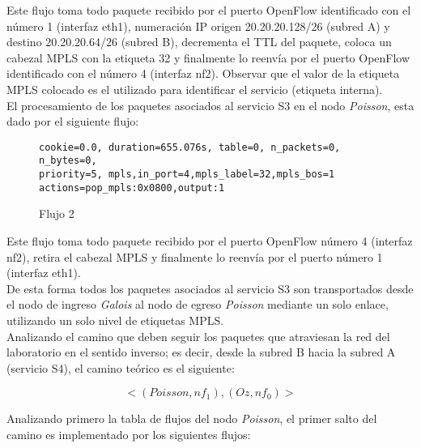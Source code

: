 Este flujo toma todo paquete recibido por el puerto OpenFlow identificado con el n\'umero 1 (interfaz eth1), numeración IP origen 20.20.20.128/26 (subred A) y destino 20.20.20.64/26 (subred B), decrementa el TTL del paquete, coloca un cabezal MPLS con la etiqueta 32 y finalmente lo reenvía por el puerto OpenFlow identificado con el n\'umero 4 (interfaz nf2). Observar que el valor de la etiqueta MPLS colocado es el utilizado para identificar el servicio (etiqueta interna). \\


El procesamiento de los paquetes asociados al servicio S3 en el nodo \textit{Poisson}, esta dado por el siguiente flujo:

\begin{figure}[h]
\texttt{cookie=0.0, duration=655.076s, table=0, n\_packets=0, n\_bytes=0, \\
priority=5, mpls,in\_port=4,mpls\_label=32,mpls\_bos=1 \\
actions=pop\_mpls:0x0800,output:1 }
\centering
\caption{Flujo 2}
\label{fig:Flujo2}
\end{figure}

Este flujo toma todo paquete recibido por el puerto OpenFlow n\'umero 4 (interfaz nf2), retira el cabezal MPLS y finalmente lo reenvía por el puerto n\'umero 1 (interfaz eth1).\\

De esta forma todos los paquetes asociados al servicio S3 son transportados desde el nodo de ingreso \textit{Galois} al nodo de egreso \textit{Poisson} mediante un solo enlace, utilizando un solo nivel de etiquetas MPLS.\\

Analizando el camino que deben seguir los paquetes que atraviesan la red del laboratorio en el sentido inverso; es decir, desde la subred B hacia la subred A (servicio S4), el camino teórico es el siguiente:

$$<(Poisson, nf_1), (Oz, nf_0)>$$ 

Analizando primero la tabla de flujos del nodo \textit{Poisson}, el primer salto del camino es implementado por los siguientes flujos:

